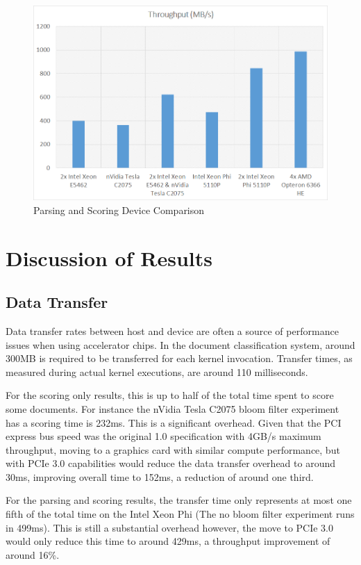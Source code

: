 \begin{figure}[H]
\centering
\includegraphics[width=\linewidth]{images/parsingScoringBest.png}
\caption{Parsing and Scoring Device Comparison}
\label{fig:parseScoringBest}
\end{figure}

\section{Discussion of Results}

\subsection{Data Transfer}

Data transfer rates between host and device are often a source of performance
issues when using accelerator chips. In the document classification system,
around 300MB is required to be transferred for each kernel invocation. Transfer
times, as measured during actual kernel executions, are around 110 milliseconds.

For the scoring only results, this is up to half of the total time spent to
score some documents. For instance the nVidia Tesla C2075 bloom filter
experiment has a scoring time is 232ms. This is a significant overhead. Given
that the PCI express bus speed was the original 1.0 specification with 4GB/s
maximum throughput, moving to a graphics card with similar compute performance,
but with PCIe 3.0 capabilities would reduce the data transfer overhead to
around 30ms, improving overall time to 152ms, a reduction of around one third.

For the parsing and scoring results, the transfer time only represents at most
one fifth of the total time on the Intel Xeon Phi (The no bloom filter
experiment runs in 499ms). This is still a substantial overhead however, the
move to PCIe 3.0 would only reduce this time to around 429ms, a throughput
improvement of around 16\%.

